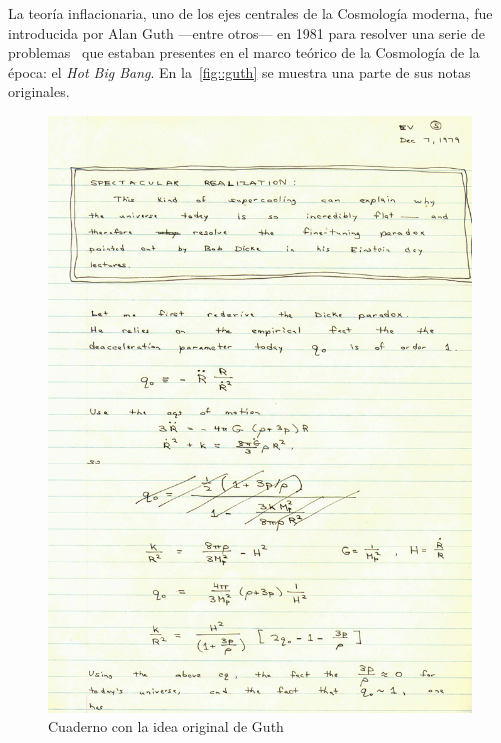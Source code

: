 La teoría inflacionaria, uno de los ejes centrales de la Cosmología moderna, fue introducida por Alan Guth ---entre otros--- en 1981 para resolver una serie de problemas~\cite{peebles1993principles} que estaban presentes en el marco teórico de la Cosmología de la época: el \textit{Hot Big Bang}. En la~\autoref{fig::guth} se muestra una parte de sus notas originales.
\begin{figure}[t]
    \centering
    \includegraphics[scale=.85]{img/AlanGuth.jpg}
    \caption{Cuaderno con la idea original de Guth}
    \label{fig::guth}
\end{figure}

